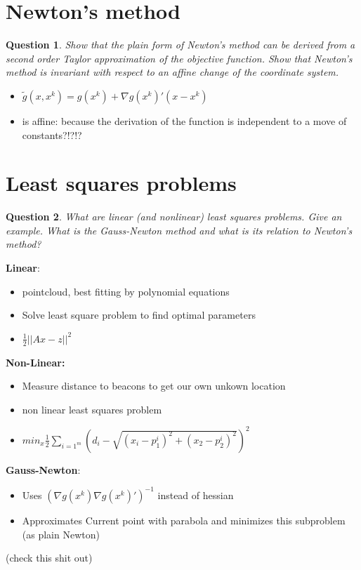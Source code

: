 \documentclass{article}
\newtheorem{question}{Question}
\begin{document}
\section{Newton's method}

\begin{question}
  Show that the plain form of Newton’s method can be derived from a second order Taylor
  approximation of the objective function. Show that Newton’s method is invariant with respect to an
  affine change of the coordinate system.
\end{question}
\begin{itemize}
\item $\tilde{g}(x, x^k) = g(x^k) + \nabla g(x^k)'(x - x^k)$
\item is affine: because the derivation of the function is independent to a move of constants?!?!?
\end{itemize}

\section{Least squares problems}

\begin{question}
  What are linear (and nonlinear) least squares problems. Give an example.  What is the Gauss-Newton
  method and what is its relation to Newton’s method?
\end{question}
\textbf{Linear}:
\begin{itemize}
\item pointcloud, best fitting by polynomial equations
\item Solve least square problem to find optimal parameters
\item $\frac{1}{2}|| Ax - z ||^2$
\end{itemize} 
\textbf{Non-Linear:}
\begin{itemize}
\item Measure distance to beacons to get our own unkown location
\item non linear least squares problem
\item $min_x \frac{1}{2} \sum_{i = 1^m} (d_i - \sqrt{(x_i - p_1^i)^2 + (x_2 - p_2^i)^2})^2$
\end{itemize} 
\textbf{Gauss-Newton}:
\begin{itemize}
\item Uses $(\nabla g(x^k)\nabla g(x^k)')^{-1}$ instead of hessian
\item Approximates Current point with parabola and minimizes this subproblem (as plain Newton)
\end{itemize}
(check this shit out)
\end{document}
